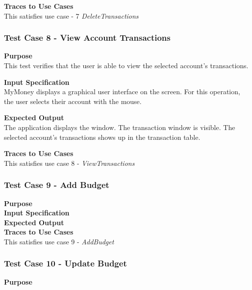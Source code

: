 \documentclass[12pt]{article}
\begin{document}
\noindent
{\bf Traces to Use Cases}\\
This satisfies use case  - 7 \textit{DeleteTransactions}

\subsubsection{Test Case 8 - View Account Transactions} \label{TC-8}
\noindent
{\bf Purpose}\\
This test verifies that the user is able to view the selected account's transactions.
                                                        
\noindent
{\bf Input Specification}\\
MyMoney displays a graphical user interface on the screen.
For this operation, the user selects their account with the mouse.

\noindent
{\bf Expected Output}\\
The application displays the window.       
The transaction window is visible.
The selected account's transactions shows up in the transaction table. 

\noindent
{\bf Traces to Use Cases}\\
This satisfies use case 8 - \textit{ViewTransactions}

\clearpage %
\subsubsection{Test Case 9 - Add Budget} \label{TC-9}
\noindent
{\bf Purpose}\\
                                                        
\noindent
{\bf Input Specification}\\

\noindent
{\bf Expected Output}\\

\noindent
{\bf Traces to Use Cases}\\
This satisfies use case 9 - \textit{AddBudget}

\subsubsection{Test Case 10 - Update Budget} \label{TC-10}
\noindent
{\bf Purpose}\\
                                                        
\end{document}
